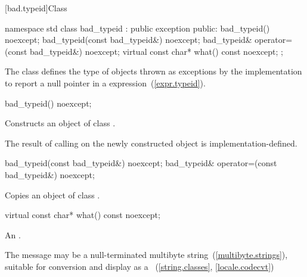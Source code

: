 [bad.typeid]{Class }

%
\begin{codeblock}
namespace std {
  class bad_typeid : public exception {
  public:
    bad_typeid() noexcept;
    bad_typeid(const bad_typeid&) noexcept;
    bad_typeid& operator=(const bad_typeid&) noexcept;
    virtual const char* what() const noexcept;
  };
}
\end{codeblock}

\pnum
The class
defines the type of objects
thrown as exceptions by the implementation to report a null pointer
in a
expression~(\ref{expr.typeid}).

%
\begin{itemdecl}
bad_typeid() noexcept;
\end{itemdecl}

\begin{itemdescr}
\pnum
\effects
Constructs an object of class
.

\pnum
\notes
The result of calling
on the newly constructed object is implementation-defined.%
\end{itemdescr}

%
%
\begin{itemdecl}
    bad_typeid(const bad_typeid&) noexcept;
    bad_typeid& operator=(const bad_typeid&) noexcept;
\end{itemdecl}

\begin{itemdescr}
\pnum
\effects
Copies an object of class
.
\end{itemdescr}

%
\begin{itemdecl}
virtual const char* what() const noexcept;
\end{itemdecl}

\begin{itemdescr}
\pnum
\returns
An  \ntbs.%

\pnum
\notes
The message may be a null-terminated multibyte string~(\ref{multibyte.strings}),
suitable for conversion and display as a
~(\ref{string.classes}, \ref{locale.codecvt})
\end{itemdescr}

